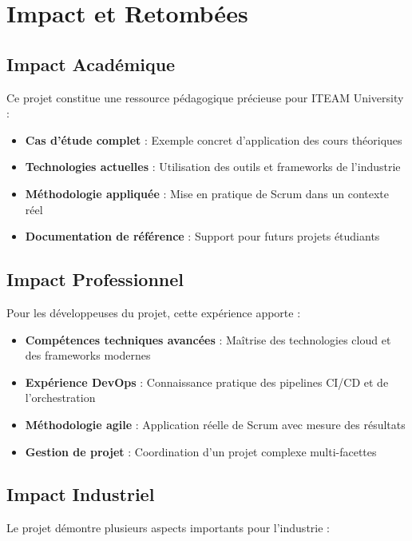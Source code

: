 \section{Impact et Retombées}

\subsection{Impact Académique}

Ce projet constitue une ressource pédagogique précieuse pour ITEAM University :

\begin{itemize}
    \item \textbf{Cas d'étude complet} : Exemple concret d'application des cours théoriques
    \item \textbf{Technologies actuelles} : Utilisation des outils et frameworks de l'industrie
    \item \textbf{Méthodologie appliquée} : Mise en pratique de Scrum dans un contexte réel
    \item \textbf{Documentation de référence} : Support pour futurs projets étudiants
\end{itemize}

\subsection{Impact Professionnel}

Pour les développeuses du projet, cette expérience apporte :

\begin{itemize}
    \item \textbf{Compétences techniques avancées} : Maîtrise des technologies cloud et des frameworks modernes
    \item \textbf{Expérience DevOps} : Connaissance pratique des pipelines CI/CD et de l'orchestration
    \item \textbf{Méthodologie agile} : Application réelle de Scrum avec mesure des résultats
    \item \textbf{Gestion de projet} : Coordination d'un projet complexe multi-facettes
\end{itemize}

\subsection{Impact Industriel}

Le projet démontre plusieurs aspects importants pour l'industrie :

